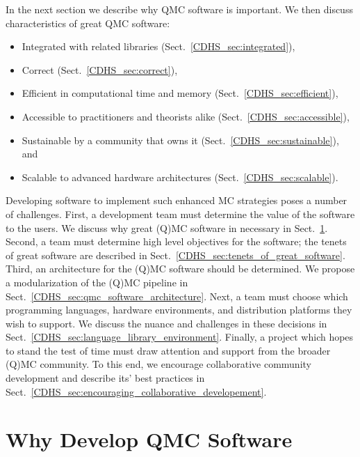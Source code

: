 \documentclass[graybox]{svmult}
\begin{document}
In the next section we describe why QMC software is important.  We then discuss characteristics of great QMC software:

\begin{itemize}
\item Integrated with related libraries (Sect.\ \ref{CDHS_sec:integrated}),

\item Correct (Sect.\ \ref{CDHS_sec:correct}),

\item Efficient in computational time and memory (Sect.\ \ref{CDHS_sec:efficient}),

\item Accessible to practitioners and theorists alike (Sect.\ \ref{CDHS_sec:accessible}),

\item Sustainable by a community that owns it (Sect.\ \ref{CDHS_sec:sustainable}), and

\item Scalable to advanced hardware architectures (Sect.\  \ref{CDHS_sec:scalable}).

\end{itemize}

Developing software to implement such enhanced MC strategies poses a number of challenges. First, a development team must determine the value of the software to the users. We discuss why great (Q)MC software in necessary in Sect.\ \ref{CDHS_sec:why_we_need_software}. Second, a team must determine high level objectives for the software; the tenets of great software are described in Sect.\ \ref{CDHS_sec:tenets_of_great_software}. Third, an architecture for the  (Q)MC software should be determined. We propose a modularization of the (Q)MC pipeline in Sect.\ \ref{CDHS_sec:qmc_software_architecture}. Next, a team must choose which programming languages, hardware environments, and distribution platforms they wish to support. We discuss the nuance and challenges in these decisions in Sect.\ \ref{CDHS_sec:language_library_environment}. Finally, a project which hopes to stand the test of time must draw attention and support from the broader (Q)MC community. To this end, we encourage collaborative community development and describe its' best practices in  Sect.\ \ref{CDHS_sec:encouraging_collaborative_developement}.

\section{Why Develop QMC Software} \label{CDHS_sec:why_we_need_software}
\end{document}
